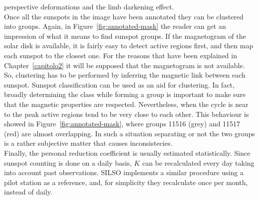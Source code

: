 perspective deformations and the limb darkening effect.\\
Once all the sunspots in the image have been annotated they can be clustered into groups. Again, in Figure~\ref{fig:annotated-mask} the reader can get an impression of what it means to find sunspot groups. If the magnetogram of the solar disk is available, it is fairly easy to detect active regions first, and then map each sunspot to the closest one. For the reasons that have been explained in Chapter~\autoref{capitolo2} it will be supposed that the magnetogram is not available. So, clustering has to be performed by inferring the magnetic link between each sunspot. Sunspot classification can be used as an aid for clustering. In fact, broadly determining the class while forming a group is important to make sure that the magnetic properties are respected. Nevertheless, when the cycle is near to the peak active regions tend to be very close to each other. This behaviour is showed in Figure~\ref{fig:annotated-mask}, where groups 11516 (grey) and 11517 (red) are almost overlapping. In such a situation separating or not the two groups is a rather subjective matter that causes inconsistecies.\\
Finally, the personal reduction coefficient is usually estimated statistically. Since sunspot counting is done on a daily basis, $K$ can be recalculated every day taking into account past observations. SILSO implements a similar procedure using a pilot station as a reference, and, for simplicity they recalculate once per month, instead of daily. \clearpage
